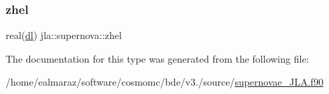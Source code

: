 \mbox{\label{structjla_1_1supernova_ab704b1fe6325eb85ae47c55050575514}} 
\subsubsection{\texorpdfstring{zhel}{zhel}}
{\footnotesize\ttfamily real(\mbox{\hyperlink{namespacejla_a3aa6435b4e08f1d532390186ac608741}{dl}}) jla\+::supernova\+::zhel\hspace{0.3cm}{\ttfamily [private]}}



The documentation for this type was generated from the following file\+:\begin{DoxyCompactItemize}
\item 
/home/ealmaraz/software/cosmomc/bde/v3./source/\mbox{\hyperlink{supernovae__JLA_8f90}{supernovae\+\_\+\+J\+L\+A.\+f90}}\end{DoxyCompactItemize}

